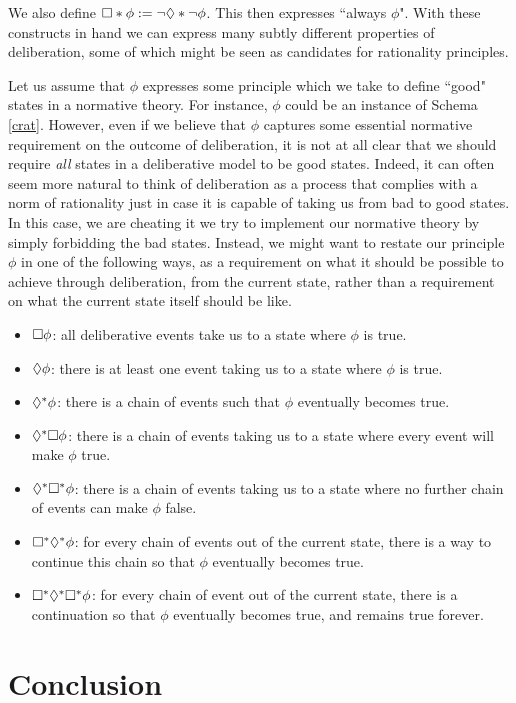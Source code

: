 \documentclass[greybox]{svmult}
\begin{document}
We also define $\square* \phi := \neg \lozenge* \neg \phi$. This then expresses ``always $\phi$". With these constructs in hand we can express many subtly different properties of deliberation, some of which might be seen as candidates for rationality principles.

Let us assume that $\phi$ expresses some principle which we take to define ``good" states in a normative theory. For instance, $\phi$ could be an instance of Schema \ref{crat}. However, even if we believe that $\phi$ captures some essential normative requirement on the outcome of deliberation, it is not at all clear that we should require \emph{all} states in a deliberative model to be good states. Indeed, it can often seem more natural to think of deliberation as a process that complies with a norm of rationality just in case it is capable of taking us from bad to good states. In this case, we are cheating it we try to implement our normative theory by simply forbidding the bad states. Instead, we might want to restate our principle $\phi$ in one of the following ways, as a requirement on what it should be possible to achieve through deliberation, from the current state, rather than a requirement on what the current state itself should be like.

\begin{itemize}
\item $\square \phi$: all deliberative events take us to a state where $\phi$ is true.
\item $\lozenge \phi$: there is at least one event taking us to a state where $\phi$ is true.
\item $\lozenge^\ast \phi$: there is a chain of events such that $\phi$ eventually becomes true.
\item $\lozenge^\ast \square \phi$: there is a chain of events taking us to a state where every event will make $\phi$ true.
\item $\lozenge^\ast \square^\ast \phi$: there is a chain of events taking us to a state where no further chain of events can make $\phi$ false.
\item $\square^\ast \lozenge^\ast \phi$: for every chain of events out of the current state, there is a way to continue this chain so that $\phi$ eventually becomes true.
\item $\square^\ast \lozenge^\ast \square^\ast \phi$: for every chain of event out of the current state, there is a continuation so that $\phi$ eventually becomes true, and remains true forever.
\end{itemize}

\section{Conclusion}\label{sec:conc}
\end{document}

